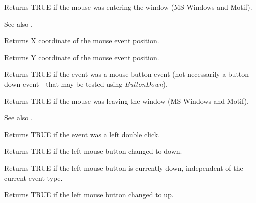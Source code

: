 
Returns TRUE if the mouse was entering the window (MS Windows and Motif).

See also .

\label{wxmouseeventgetx}


Returns X coordinate of the mouse event position.

\label{wxmouseeventgety}


Returns Y coordinate of the mouse event position.



Returns TRUE if the event was a mouse button event (not necessarily a button down event -
that may be tested using {\it ButtonDown}).

\label{wxmouseeventleaving}


Returns TRUE if the mouse was leaving the window (MS Windows and Motif).

See also .



Returns TRUE if the event was a left double click.



Returns TRUE if the left mouse button changed to down.



Returns TRUE if the left mouse button is currently down, independent
of the current event type.



Returns TRUE if the left mouse button changed to up.


